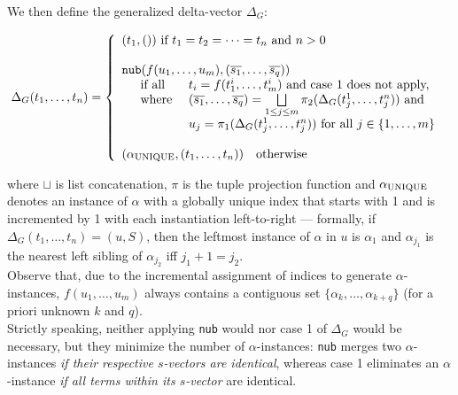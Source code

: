 \documentclass[a4paper, 11pt]{report}
\newcommand{\mt}[1]{\textnormal{#1}}
\begin{document}
\noindent
We then define the generalized delta-vector $\Delta_G$:

$$
  \Delta_G(t_1,\dots,t_n) = \left\{
    \begin{array}{l}

    (t_1,()) \mt{ if } t_1 = t_2 = \dots = t_n \mt{ and } n > 0\\
    \\

    \texttt{nub}(f(u_1,\dots,u_m), (\overline{s_1},\dots,\overline{s_q})) %
    \\
    \quad
    \begin{array}{l l}
      \mt{if all } & t_i = f(t_1^i,\dots,t_m^i) \mt{ and case 1 does not apply,}\\
      \mt{where } & (\overline{s_1},\dots,\overline{s_q}) = \bigsqcup\limits_{1 \leq j \leq m} \pi_2(\Delta_G(t_j^1,\dots,t_j^n)) \mt{ and}\\
                  & u_j = \pi_1(\Delta_G(t_j^1,\dots,t_j^n)) \mt{ for all } j \in \{1,\dots,m \}\\
    \end{array}
    
    \\
    \\
    
    (\alpha_{\mt{UNIQUE}},(t_1,\dots,t_n))\quad \mt{otherwise}\\
    \end{array}
  \right.
$$

\noindent
where $\sqcup$ is list concatenation, $\pi$ is the tuple projection function and $\alpha_{\mt{UNIQUE}}$ denotes an instance of $\alpha$ with a globally unique index that starts with 1 and is incremented by 1 with each instantiation left-to-right --- formally, if $\Delta_G(t_1,\dots,t_n) = (u,S)$, then the leftmost instance of $\alpha$ in $u$ is $\alpha_1$ and $\alpha_{j_1}$ is the nearest left sibling of $\alpha_{j_2}$ iff $j_1+1=j_2$.\\

Observe that, due to the incremental assignment of indices to generate $\alpha$-instances, $f(u_1,\dots,u_m)$ always contains a contiguous set $\{\alpha_k,\dots,\alpha_{k+q}\}$ (for a priori unknown $k$ and $q$).\\

Strictly speaking, neither applying \texttt{nub} would nor case 1 of $\Delta_G$ would be necessary, but they minimize the number of $\alpha$-instances: \texttt{nub} merges two $\alpha$-instances {\em if their respective $s$-vectors are identical}, whereas case 1 eliminates an $\alpha$-instance {\em if all terms within its $s$-vector} are identical.
\end{document}
